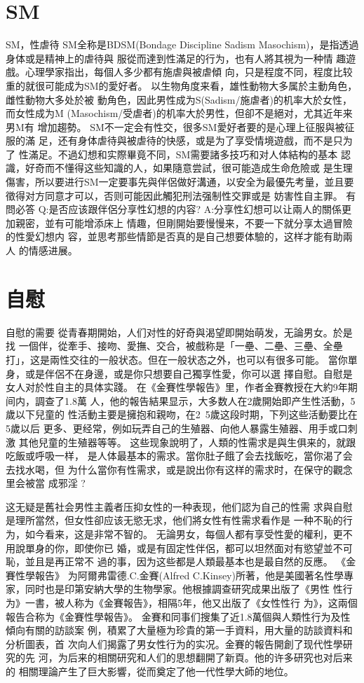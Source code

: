 \documentclass[12pt,UTF8]{ctexbook}
\begin{document}
\chapter{SM}

SM，性虐待
SM全称是BDSM(Bondage Discipline Sadism
Masochism)，是指透過身体或是精神上的虐待與
服從而達到性滿足的行为，也有人將其視为一种情
趣遊戲。心理學家指出，每個人多少都有施虐與被虐傾
向，只是程度不同，程度比较重的就很可能成为SM的愛好者。
以生物角度来看，雄性動物大多属於主動角色，雌性動物大多处於被
動角色，因此男性成为S(Sadism/施虐者)的机率大於女性，而女性成为M
(Masochism/受虐者)的机率大於男性，但卻不是絕对，尤其近年来男M有
增加趨勢。
SM不一定会有性交，很多SM愛好者要的是心理上征服與被征服的滿
足，还有身体虐待與被虐待的快感，或是为了享受情境遊戲，而不是只为了
性滿足。不過幻想和实際畢竟不同，SM需要諸多技巧和对人体結构的基本
認識，好奇而不懂得这些知識的人，如果隨意尝試，很可能造成生命危險或
是生理傷害，所以要进行SM一定要事先與伴侶做好溝通，以安全为最優先考量，並且要徵得对方同意才可以，否则可能因此觸犯刑法强制性交罪或是
妨害性自主罪。
有問必答
Q:是否应该跟伴侶分享性幻想的内容?
A:分享性幻想可以让兩人的關係更加親密，並有可能增添床上
情趣，但剛開始要慢慢来，不要一下就分享太過冒險的性愛幻想内
容，並思考那些情節是否真的是自己想要体驗的，这样才能有助兩人
的情感进展。

\chapter{自慰}

自慰的需要
從青春期開始，人们对性的好奇與渴望即開始萌发，无論男女。於是找
一個伴，從牽手、接吻、愛撫、交合，被戲称是「一壘、二壘、三壘、全壘
打」，这是兩性交往的一般状态。但在一般状态之外，也可以有很多可能。
當你單身，或是伴侶不在身邊，或是你只想要自己獨享性愛，你可以選
擇自慰。自慰是女人对於性自主的具体实踐。
在《金賽性學報告》里，作者金賽教授在大約9年期间内，調查了1.8萬
人，他的報告結果显示，大多数人在2歲開始即产生性活動，5歲以下兒童的
性活動主要是擁抱和親吻，在2~5歲这段时期，下列这些活動要比在5歲以后
更多、更经常，例如玩弄自己的生殖器、向他人暴露生殖器、用手或口刺激
其他兒童的生殖器等等。
这些现象說明了，人類的性需求是與生俱来的，就跟吃飯或呼吸一样，
是人体最基本的需求。當你肚子餓了会去找飯吃，當你渴了会去找水喝，但
为什么當你有性需求，或是說出你有这样的需求时，在保守的觀念里会被當
成邪淫 ?

这无疑是舊社会男性主義者压抑女性的一种表现，他们認为自己的性需
求與自慰是理所當然，但女性卻应该无慾无求，他们將女性有性需求看作是
一种不恥的行为，如今看来，这是非常不智的。
无論男女，每個人都有享受性愛的權利，更不用說單身的你，即使你已
婚，或是有固定性伴侶，都可以坦然面对有慾望並不可恥，並且是再正常不
過的事，因为这些都是人類最基本也是最自然的反應。
《金賽性學報告》
为阿爾弗雷德.C.金賽(Alfred C.Kinsey)所著，他是美國著名性學專
家，同时也是印第安納大學的生物學家。他根據調查研究成果出版了《男性
性行为》一書，被人称为《金賽報告》，相隔5年，他又出版了《女性性行
为》，这兩個報告合称为《金賽性學報告》。
金賽和同事们搜集了近1.8萬個與人類性行为及性傾向有關的訪談案
例，積累了大量極为珍貴的第一手資料，用大量的訪談資料和分析圖表，首
次向人们揭露了男女性行为的实况。金賽的報告開創了现代性學研究的先
河，为后来的相關研究和人们的思想翻開了新頁。他的许多研究也对后来的
相關理論产生了巨大影響，從而奠定了他一代性學大師的地位。
\end{document}
